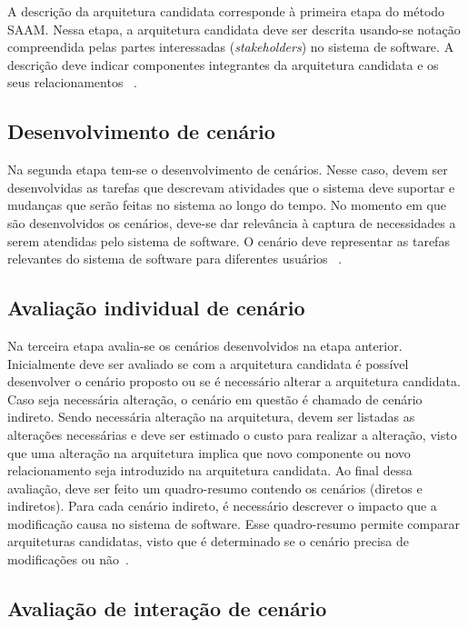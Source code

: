 A descrição da arquitetura candidata corresponde à primeira etapa do método SAAM. Nessa etapa, a arquitetura candidata deve ser descrita usando-se notação compreendida pelas partes interessadas (\emph{stakeholders}) no sistema de software. A descrição deve indicar componentes integrantes da arquitetura candidata e os seus relacionamentos ~\cite{scenario_methods}.

\subsection{Desenvolvimento de cenário}

Na segunda etapa tem-se o desenvolvimento de cenários. Nesse caso, devem ser desenvolvidas as tarefas que descrevam atividades que o sistema deve suportar e mudanças que serão feitas no sistema ao longo do tempo. No momento em que são desenvolvidos os cenários, deve-se dar relevância à captura de necessidades a serem atendidas pelo sistema de software. O cenário deve representar as tarefas relevantes do sistema de software para diferentes usuários ~\cite{scenario_methods}. 

\subsection{Avaliação individual de cenário}

Na terceira etapa  avalia-se os cenários desenvolvidos na etapa anterior. Inicialmente deve ser avaliado se com a arquitetura candidata é possível desenvolver o cenário proposto ou se é necessário alterar a arquitetura candidata. Caso seja necessária alteração, o cenário em questão é chamado de cenário indireto. Sendo necessária alteração na arquitetura, devem ser listadas as alterações necessárias e deve ser estimado o custo para realizar a alteração, visto que uma alteração na arquitetura implica que novo componente ou novo relacionamento seja introduzido na arquitetura candidata. Ao final dessa avaliação, deve ser feito um quadro-resumo contendo os cenários (diretos e indiretos). Para cada cenário indireto, é necessário descrever o impacto que a modificação causa no sistema de software. Esse quadro-resumo permite comparar arquiteturas candidatas, visto que é determinado se o cenário precisa de modificações ou não~\cite{scenario_methods}.

\subsection{Avaliação de interação de cenário}

